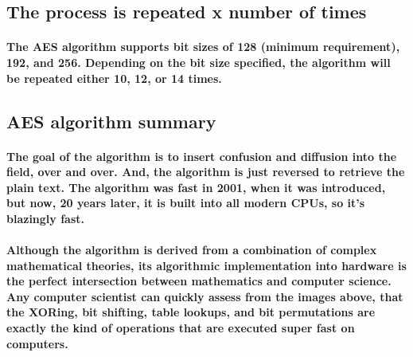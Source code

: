 \subsection{The process is repeated x number of times}
\paragraph{The AES algorithm supports bit sizes of 128 (minimum requirement), 192, and 256. Depending on the bit size specified, the algorithm will be repeated either 10, 12, or 14 times.}



\subsection{AES algorithm summary}
\paragraph{The goal of the algorithm is to insert confusion and diffusion into the field, over and over. And, the algorithm is just reversed to retrieve the plain text. The algorithm was fast in 2001, when it was introduced, but now, 20 years later, it is built into all modern CPUs, so it's blazingly fast.}

\paragraph{Although the algorithm is derived from a combination of complex mathematical theories, its algorithmic implementation into hardware is the perfect intersection between mathematics and computer science. Any computer scientist can quickly assess from the images above, that the XORing, bit shifting, table lookups, and bit permutations are exactly the kind of operations that are executed super fast on computers.}\cite[p. 178]{Dooley}


